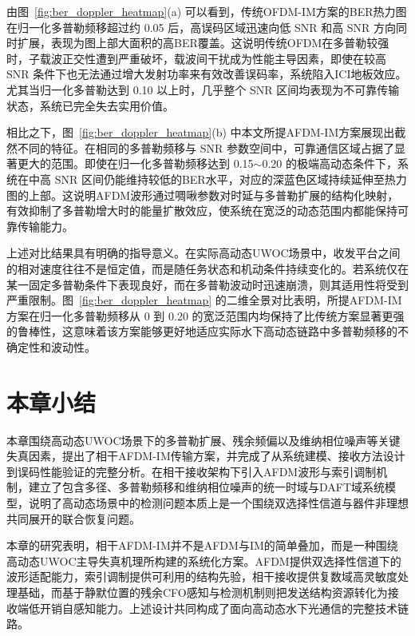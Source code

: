 由图~\ref{fig:ber_doppler_heatmap}(a) 可以看到，传统OFDM-IM方案的BER热力图在归一化多普勒频移超过约 0.05 后，高误码区域迅速向低 SNR 和高 SNR 方向同时扩展，表现为图上部大面积的高BER覆盖。这说明传统OFDM在多普勒较强时，子载波正交性遭到严重破坏，载波间干扰成为性能主导因素，即使在较高 SNR 条件下也无法通过增大发射功率来有效改善误码率，系统陷入ICI地板效应。尤其当归一化多普勒达到 0.10 以上时，几乎整个 SNR 区间均表现为不可靠传输状态，系统已完全失去实用价值。

相比之下，图~\ref{fig:ber_doppler_heatmap}(b) 中本文所提AFDM-IM方案展现出截然不同的特征。在相同的多普勒频移与 SNR 参数空间中，可靠通信区域占据了显著更大的范围。即使在归一化多普勒频移达到 0.15$\sim$0.20 的极端高动态条件下，系统在中高 SNR 区间仍能维持较低的BER水平，对应的深蓝色区域持续延伸至热力图的上部。这说明AFDM波形通过啁啾参数对时延与多普勒扩展的结构化映射，有效抑制了多普勒增大时的能量扩散效应，使系统在宽泛的动态范围内都能保持可靠传输能力。


上述对比结果具有明确的指导意义。在实际高动态UWOC场景中，收发平台之间的相对速度往往不是恒定值，而是随任务状态和机动条件持续变化的。若系统仅在某一固定多普勒条件下表现良好，而在多普勒波动时迅速崩溃，则其适用性将受到严重限制。图~\ref{fig:ber_doppler_heatmap} 的二维全景对比表明，所提AFDM-IM方案在归一化多普勒频移从 0 到 0.20 的宽泛范围内均保持了比传统方案显著更强的鲁棒性，这意味着该方案能够更好地适应实际水下高动态链路中多普勒频移的不确定性和波动性。
\section{本章小结}

本章围绕高动态UWOC场景下的多普勒扩展、残余频偏以及维纳相位噪声等关键失真因素，提出了相干AFDM-IM传输方案，并完成了从系统建模、接收方法设计到误码性能验证的完整分析。在相干接收架构下引入AFDM波形与索引调制机制，建立了包含多径、多普勒频移和维纳相位噪声的统一时域与DAFT域系统模型，说明了高动态场景中的检测问题本质上是一个围绕双选择性信道与器件非理想共同展开的联合恢复问题。

本章的研究表明，相干AFDM-IM并不是AFDM与IM的简单叠加，而是一种围绕高动态UWOC主导失真机理所构建的系统化方案。AFDM提供双选择性信道下的波形适配能力，索引调制提供可利用的结构先验，相干接收提供复数域高灵敏度处理基础，而基于静默位置的残余CFO感知与检测机制则把发送结构资源转化为接收端低开销自感知能力。上述设计共同构成了面向高动态水下光通信的完整技术链路。
